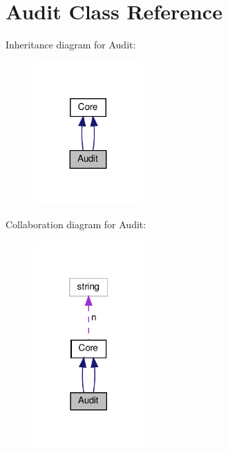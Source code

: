 \hypertarget{classAudit}{}\section{Audit Class Reference}
\label{classAudit}


Inheritance diagram for Audit\+:\nopagebreak
\begin{figure}[H]
\begin{center}
\leavevmode
\includegraphics[width=119pt]{classAudit__inherit__graph}
\end{center}
\end{figure}


Collaboration diagram for Audit\+:\nopagebreak
\begin{figure}[H]
\begin{center}
\leavevmode
\includegraphics[width=121pt]{classAudit__coll__graph}
\end{center}
\end{figure}
